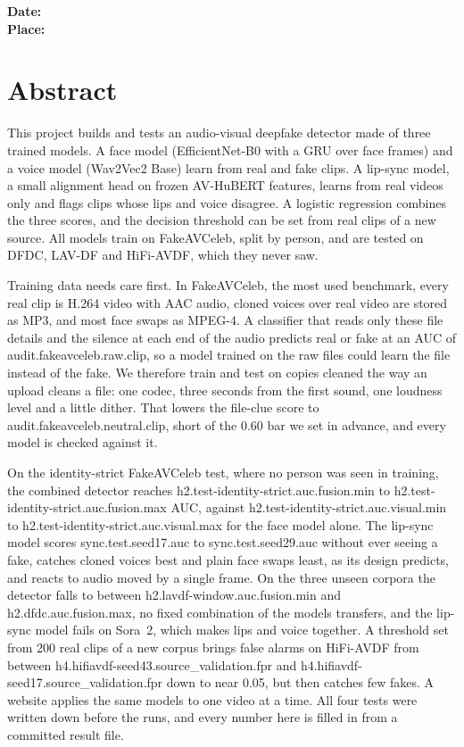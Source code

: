 \vspace{24pt}

\noindent\textbf{Date:}\\
\noindent\textbf{Place:} \PlaceCity

\clearpage

%
%
\chapter*{Abstract}

This project builds and tests an audio-visual deepfake detector made of three
trained models. A face model (EfficientNet-B0 with a GRU over face frames) and
a voice model (Wav2Vec2 Base) learn from real and fake clips. A lip-sync model,
a small alignment head on frozen AV-HuBERT features, learns from real videos
only and flags clips whose lips and voice disagree. A logistic regression
combines the three scores, and the decision threshold can be set from real
clips of a new source. All models train on FakeAVCeleb, split by person, and
are tested on DFDC, LAV-DF and HiFi-AVDF, which they never saw.

Training data needs care first. In FakeAVCeleb, the most used benchmark, every
real clip is H.264 video with AAC audio, cloned voices over real video are
stored as MP3, and most face swaps as MPEG-4. A classifier that reads only these
file details and the silence at each end of the audio predicts real or fake at
an AUC of {{audit.fakeavceleb.raw.clip}}, so a model trained on the raw files
could learn the file instead of the fake. We therefore train and test on copies
cleaned the way an upload cleans a file: one codec, three seconds from the first
sound, one loudness level and a little dither. That lowers the file-clue score to
{{audit.fakeavceleb.neutral.clip}}, short of the 0.60 bar we set in advance, and
every model is checked against it.

On the identity-strict FakeAVCeleb test, where no person was seen in training,
the combined detector reaches {{h2.test-identity-strict.auc.fusion.min}} to
{{h2.test-identity-strict.auc.fusion.max}} AUC, against
{{h2.test-identity-strict.auc.visual.min}} to
{{h2.test-identity-strict.auc.visual.max}} for the face model alone. The
lip-sync model scores {{sync.test.seed17.auc}} to {{sync.test.seed29.auc}}
without ever seeing a fake, catches cloned voices best and plain face swaps
least, as its design predicts, and reacts to audio moved by a single frame. On
the three unseen corpora the detector falls to between
{{h2.lavdf-window.auc.fusion.min}} and {{h2.dfdc.auc.fusion.max}}, no fixed
combination of the models transfers, and the lip-sync model fails on Sora~2,
which makes lips and voice together. A threshold set from 200 real clips of a
new corpus brings false alarms on HiFi-AVDF from between
{{h4.hifiavdf-seed43.source_validation.fpr}} and
{{h4.hifiavdf-seed17.source_validation.fpr}} down to near 0.05, but then
catches few fakes. A website applies the same models to one video at a time.
All four tests were written down before the runs, and every number here is
filled in from a committed result file.


